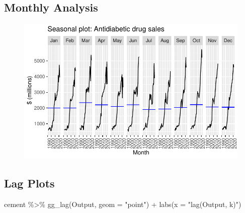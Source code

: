 \documentclass[
  letterpaper,
  DIV=11,
  numbers=noendperiod]{scrartcl}
\newenvironment{Shaded}{\begin{snugshade}}{\end{snugshade}}
\newcommand{\AttributeTok}[1]{\textcolor[rgb]{0.40,0.45,0.13}{#1}}
\newcommand{\DocumentationTok}[1]{\textcolor[rgb]{0.37,0.37,0.37}{\textit{#1}}}
\newcommand{\FunctionTok}[1]{\textcolor[rgb]{0.28,0.35,0.67}{#1}}
\newcommand{\NormalTok}[1]{\textcolor[rgb]{0.00,0.23,0.31}{#1}}
\newcommand{\SpecialCharTok}[1]{\textcolor[rgb]{0.37,0.37,0.37}{#1}}
\newcommand{\StringTok}[1]{\textcolor[rgb]{0.13,0.47,0.30}{#1}}
\begin{document}
\hypertarget{monthly-analysis}{%
\subsection{Monthly Analysis}\label{monthly-analysis}}

\begin{Shaded}
\end{Shaded}

\begin{figure}[H]

{\centering \includegraphics[width=17.1875in,height=\textheight]{cement_files/figure-pdf/unnamed-chunk-14-1.pdf}

}

\end{figure}

\hypertarget{lag-plots}{%
\subsection{Lag Plots}\label{lag-plots}}

\begin{Shaded}
\begin{Highlighting}[]

\NormalTok{cement }\SpecialCharTok{\%\textgreater{}\%}
  \FunctionTok{gg\_lag}\NormalTok{(Output, }\AttributeTok{geom =} \StringTok{"point"}\NormalTok{) }\SpecialCharTok{+}
  \FunctionTok{labs}\NormalTok{(}\AttributeTok{x =} \StringTok{"lag(Output, k)"}\NormalTok{)}
\end{Highlighting}
\end{Shaded}
\end{document}
